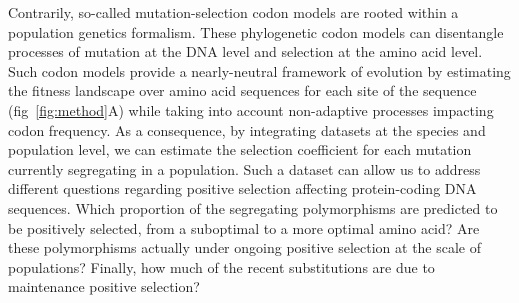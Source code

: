 \documentclass{article}
\begin{document}
    Contrarily, so-called mutation-selection codon models are rooted within a population genetics formalism\cite{halpern_evolutionary_1998, mccandlish_modeling_2014}.
    These phylogenetic codon models can disentangle processes of mutation at the DNA level and selection at the amino acid level.
    Such codon models provide a nearly-neutral framework of evolution by estimating the fitness landscape over amino acid sequences for each site of the sequence (fig~\ref{fig:method}A) while taking into account non-adaptive processes impacting codon frequency\cite{halpern_evolutionary_1998, rodrigue_mechanistic_2010, tamuri_estimating_2012}.
    As a consequence, by integrating datasets at the species and population level, we can estimate the selection coefficient for each mutation currently segregating in a population.
    Such a dataset can allow us to address different questions regarding positive selection affecting protein-coding DNA sequences.
    Which proportion of the segregating polymorphisms are predicted to be positively selected, from a suboptimal to a more optimal amino acid?
    Are these polymorphisms actually under ongoing positive selection at the scale of populations?
    Finally, how much of the recent substitutions are due to maintenance positive selection?
\end{document}
